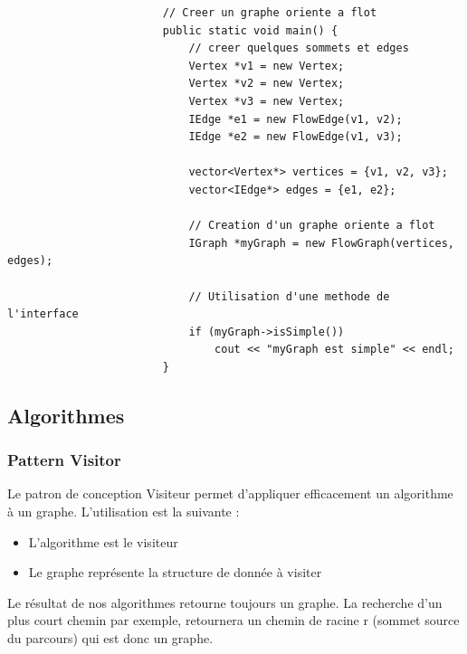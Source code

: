 \documentclass[french]{article}
\begin{document}
			\begin{lstlisting}
						// Creer un graphe oriente a flot
						public static void main() {
							// creer quelques sommets et edges
							Vertex *v1 = new Vertex;
							Vertex *v2 = new Vertex;
							Vertex *v3 = new Vertex;
							IEdge *e1 = new FlowEdge(v1, v2);
							IEdge *e2 = new FlowEdge(v1, v3);
							
							vector<Vertex*> vertices = {v1, v2, v3};
							vector<IEdge*> edges = {e1, e2};
							
							// Creation d'un graphe oriente a flot
							IGraph *myGraph = new FlowGraph(vertices, edges);
							
							// Utilisation d'une methode de l'interface
							if (myGraph->isSimple())
								cout << "myGraph est simple" << endl;
						}
			\end{lstlisting}
			
		\subsection{Algorithmes}
			\subsubsection{Pattern Visitor}
			Le patron de conception Visiteur permet d'appliquer efficacement un algorithme à un graphe. L'utilisation est la suivante :
			\begin{itemize}
				\item L'algorithme est le visiteur
				\item Le graphe représente la structure de donnée à visiter
			\end{itemize}
			Le résultat de nos algorithmes retourne toujours un graphe. La recherche d'un plus court chemin par exemple, retournera un chemin de racine r (sommet source du parcours) qui est donc un graphe.\\
			
\end{document}
